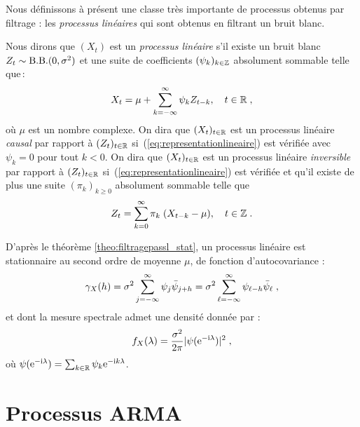 Nous d\'efinissons \`a pr\'esent une classe tr\`es importante de processus
obtenus par filtrage : les \emph{processus lin\'eaires} qui sont obtenus
en filtrant un bruit blanc.
\begin{definition}
\label{def:proc_lin}
Nous dirons que $(X_{t})$ est un \emph{processus lin\'eaire} s'il existe
un bruit blanc $Z_{t} \sim \mathrm{B.B.}(0,\sigma^2)$ et une suite de coefficients
$(\psi_k)_{k \in \mathbb{Z}}$ absolument sommable telle que\,:
\begin{equation}
\label{eq:representationlineaire}
 X_{t}= \mu+\sum_{k=-\infty}^\infty \psi_k Z_{t-k},\quad t\in\mathbb{R}\;,
\end{equation}
o\`u $\mu$ est un nombre complexe. On dira que $(X_t)_{t\in\mathbb{R}}$ est un
processus lin\'eaire \emph{causal} par rapport \`a $(Z_t)_{t\in\mathbb{R}}$
si~(\ref{eq:representationlineaire}) est v\'erifi\'ee avec $\psi_k=0$ pour tout
$k<0$.  On dira que $(X_t)_{t\in\mathbb{R}}$ est un processus lin\'eaire
\emph{inversible} par rapport \`a $(Z_t)_{t\in\mathbb{R}}$
si~(\ref{eq:representationlineaire}) est v\'erifi\'ee et qu'il existe de plus une
suite $(\pi_k)_{k\geq0}$ absolument sommable telle que
\begin{equation}
\label{eq:representationlineaireinversible}
 Z_{t}= \sum_{k=0}^\infty \pi_k \; (X_{t-k}-\mu),\quad t\in\mathbb{Z}\;.
\end{equation}
\end{definition}
D'apr\`es le th\'eor\`eme \ref{theo:filtragepassl_stat}, un processus
lin\'eaire est stationnaire au second ordre de moyenne
$\mu$, de fonction d'autocovariance :
\begin{equation}\label{eq:gamm_proc_lin}
  \gamma_X(h)= \sigma^2 \sum_{j=-\infty}^\infty \psi_j \bar{\psi}_{j+h}= \sigma^2 \sum_{\ell=-\infty}^\infty \psi_{\ell-h} \bar{\psi}_{\ell}\;,
\end{equation}
et dont la mesure spectrale admet une densit\'e  donn\'ee par :
\begin{equation}
  \label{eq:dps_modlin}
  f_X(\lambda) = \frac{\sigma^2}{2 \pi} |\psi(\mathrm{e}^{-\mathrm{i}\lambda})|^2\; ,
\end{equation}
o\`u $\psi(\mathrm{e}^{-\mathrm{i}\lambda}) = \sum_{k\in \mathbb{R}} \psi_k \mathrm{e}^{-\mathrm{i} k \lambda}$.



\section{Processus ARMA}
\label{s:procARMA}

